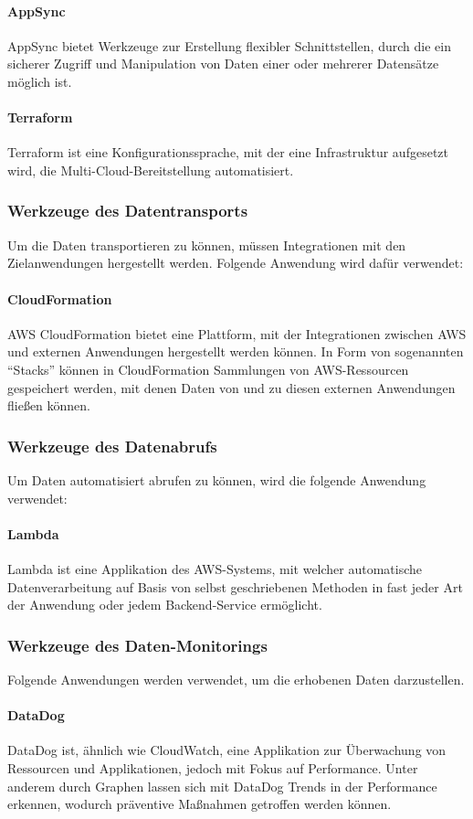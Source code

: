 \paragraph{AppSync} 
AppSync bietet Werkzeuge zur Erstellung flexibler Schnittstellen, durch die ein sicherer Zugriff und Manipulation von Daten einer oder mehrerer Datensätze möglich ist. 
\paragraph{Terraform} 
Terraform ist eine Konfigurationssprache, mit der eine Infrastruktur aufgesetzt wird, die Multi-Cloud-Bereitstellung automatisiert. \cite{HashiCorp2024} 
\subsubsection{Werkzeuge des Datentransports}
Um die Daten transportieren zu können, müssen Integrationen mit den Zielanwendungen hergestellt werden. Folgende Anwendung wird dafür verwendet:
\paragraph{CloudFormation}
AWS CloudFormation bietet eine Plattform, mit der Integrationen zwischen AWS und externen Anwendungen hergestellt werden können. In Form von sogenannten ``Stacks'' können in CloudFormation Sammlungen von AWS-Ressourcen gespeichert werden, mit denen Daten von und zu diesen externen Anwendungen fließen können.
\subsubsection{Werkzeuge des Datenabrufs}
Um Daten automatisiert abrufen zu können, wird die folgende Anwendung verwendet:
\paragraph{Lambda}
Lambda ist eine Applikation des AWS-Systems, mit welcher automatische Datenverarbeitung auf Basis von selbst geschriebenen Methoden in fast jeder Art der Anwendung oder jedem Backend-Service ermöglicht. \cite{AWS2024d} 
 
 \subsubsection{Werkzeuge des Daten-Monitorings}
Folgende Anwendungen werden verwendet, um die erhobenen Daten darzustellen.
\paragraph{DataDog} 
DataDog ist, ähnlich wie CloudWatch, eine Applikation zur Überwachung von Ressourcen und Applikationen, jedoch mit Fokus auf Performance. Unter anderem durch Graphen lassen sich mit DataDog Trends in der Performance erkennen, wodurch präventive Maßnahmen getroffen werden können. \cite{DataDog2024} 
